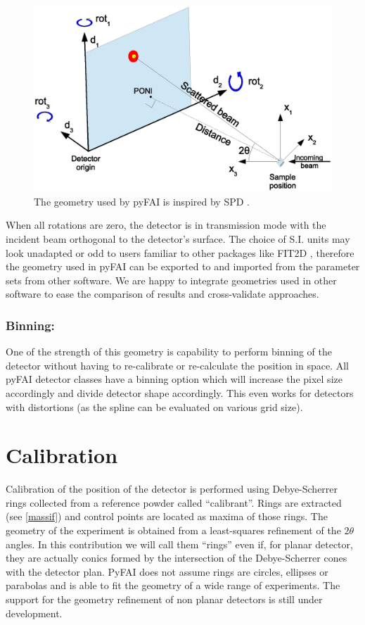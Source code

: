 \documentclass[preprint]{iucr}
\begin{document}
\begin{figure}
\label{PONI}
\begin{center}
\includegraphics[width=15cm]{PONI.eps}
\caption{The geometry used by pyFAI is inspired by SPD \cite{spd}.}
\end{center}
\end{figure}

When all rotations are zero, the detector is in transmission mode with the
incident beam orthogonal to the detector's surface.
The choice of S.I. units may look unadapted or odd to users familiar to
other packages like FIT2D \cite{fit2d}, therefore the geometry used in pyFAI can be
exported to and imported from the parameter sets from other software.
We are happy to integrate geometries used in other software to ease the
comparison of results and cross-validate approaches.

\subsubsection{Binning:}
One of the strength of this geometry is capability to perform binning of the
detector without having to re-calibrate or re-calculate the position in space.
All pyFAI detector classes have a binning option which will increase the pixel
size accordingly and divide detector shape accordingly.
This even works for detectors with distortions (as the spline can be
evaluated on various grid size).

\section{Calibration}

Calibration of the position of the detector is performed using Debye-Scherrer
rings collected from a reference powder called ``calibrant''.
Rings are extracted (see \ref{massif}) and control points are located as maxima
of those rings.
The geometry of the experiment is obtained from a least-squares refinement of
the $2\theta$ angles.
In this contribution we will call them ``rings'' even if, for planar detector,
they are actually conics formed by the intersection of the Debye-Scherrer cones
with the detector plan.
PyFAI does not assume rings are circles, ellipses or parabolas and is able to
fit the geometry of a wide range of experiments.
The support for the geometry refinement of non planar detectors is still under
development.
\end{document}
